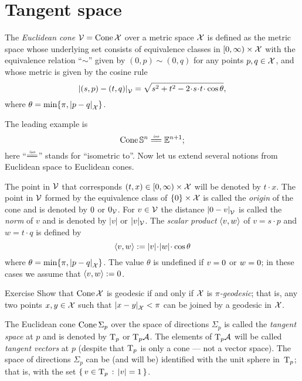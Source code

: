 \section{Tangent space}\label{sec: tangent space}

The \emph{Euclidean cone} $\mathcal{V}=\mathop{\rm Cone}\nolimits\mathcal{X}$ 
over a metric space $\mathcal{X}$
is defined as the metric space whose underlying set consists of
equivalence classes in
$[0,\infty)\times \mathcal{X}$ with the equivalence relation ``$\sim$'' given by $(0,p)\sim (0,q)$ for any points $p,q\in\mathcal{X}$,
and whose metric is given by the cosine rule
\[
\dist{(s,p)}{(t,q)}{\spc{V}} 
=
\sqrt{s^2+t^2-2\cdot s\cdot t\cdot \cos\theta},
\]
where $\theta= \min\{\pi, |{p}-{q}|_{\mathcal{X}}^{{}}\}$.

The leading example is
\[\Cone\SSS^n\iso\EE^{n+1};\]
here ``$\iso$'' stands for ``isometric to''. 
Now let us extend several notions from Euclidean space to Euclidean cones. 

The point in $\mathcal{V}$ that corresponds $(t,x)\in[0,\infty)\times \mathcal{X}$ will be denoted by $t\cdot x$.
The point in $\mathcal{V}$ formed by the equivalence class of $\{0\}\times\mathcal{X}$ is called the \emph{origin} of the cone and is denoted by $0$ or $0_{\mathcal{V}}$.
For $v\in\mathcal{V}$ the distance $|{0}-{v}|_{\mathcal{V}}^{{}}$ is called the \emph{norm} of $v$ and is denoted by $|v|$ or $|v|_{\mathcal{V}}$.
The \emph{scalar product} $\langle v,w\rangle$
of $v=s\cdot p$ and $w=t\cdot q$
is defined by 
\[\<v,w\>
\df |v|\cdot|w|\cdot\cos\theta
\]
where $\theta= \min\{\pi, |{p}-{q}|_{\mathcal{X}}^{{}}\}$.
The value $\theta$ is undefined if $v=0$ or $w=0$;
in these cases we assume that $\langle v,w\rangle\mathrel{:=}0$.

\begin{thm}{Exercise}\label{ex:geodesic-cone}
Show that $\mathop{\rm Cone}\nolimits\mathcal{X}$ is geodesic if and only if $\mathcal{X}$ is \emph{$\pi$-geodesic};
that is, any two points $x,y\in \mathcal{X}$ such that $|{x}-{y}|_{\mathcal{X}}^{{}}<\pi$ can be joined by a geodesic in $\mathcal{X}$.
\end{thm}

The Euclidean cone $\mathop{\rm Cone}\nolimits\Sigma_p$ over the space of directions $\Sigma_p$ is called the \emph{tangent space} at $p$ and is denoted by $\mathrm{T}_p$ or $\mathrm{T}_p\mathcal{A}$.
The elements of $\mathrm{T}_p\mathcal{A}$ will be called \emph{tangent vectors} at $p$
(despite that $\mathrm{T}_p$ is only a cone --- not a vector space).
The space of directions $\Sigma_p$ can be (and will be) identified with the unit sphere in~$\mathrm{T}_p$;
that is, with the set $\left\{\,{v\in\mathrm{T}_p}\,:\,{|v|=1}\,\right\}$.

